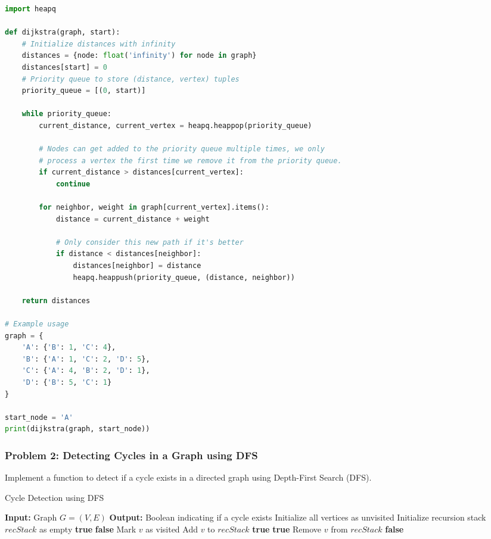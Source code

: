 \documentclass[12pt]{book} %
\begin{document}
\FloatBarrier
\begin{lstlisting}[language=Python, caption=Python implementation of Dijkstra's Algorithm]
import heapq

def dijkstra(graph, start):
    # Initialize distances with infinity
    distances = {node: float('infinity') for node in graph}
    distances[start] = 0
    # Priority queue to store (distance, vertex) tuples
    priority_queue = [(0, start)]
    
    while priority_queue:
        current_distance, current_vertex = heapq.heappop(priority_queue)
        
        # Nodes can get added to the priority queue multiple times, we only
        # process a vertex the first time we remove it from the priority queue.
        if current_distance > distances[current_vertex]:
            continue
        
        for neighbor, weight in graph[current_vertex].items():
            distance = current_distance + weight
            
            # Only consider this new path if it's better
            if distance < distances[neighbor]:
                distances[neighbor] = distance
                heapq.heappush(priority_queue, (distance, neighbor))
    
    return distances

# Example usage
graph = {
    'A': {'B': 1, 'C': 4},
    'B': {'A': 1, 'C': 2, 'D': 5},
    'C': {'A': 4, 'B': 2, 'D': 1},
    'D': {'B': 5, 'C': 1}
}

start_node = 'A'
print(dijkstra(graph, start_node))
\end{lstlisting}
\FloatBarrier

\subsubsection*{Problem 2: Detecting Cycles in a Graph using DFS}
Implement a function to detect if a cycle exists in a directed graph using Depth-First Search (DFS).

\begin{algorithm}
\caption{Cycle Detection using DFS}
\begin{algorithmic}[1]
\State \textbf{Input:} Graph $G=(V, E)$
\State \textbf{Output:} Boolean indicating if a cycle exists
\State Initialize all vertices as unvisited
\State Initialize recursion stack $recStack$ as empty
            \State \Return \textbf{true}
        \EndIf
    \EndIf
\EndFor
\State \Return \textbf{false}
    \State Mark $v$ as visited
    \State Add $v$ to $recStack$
            \State \Return \textbf{true}
            \State \Return \textbf{true}
        \EndIf
    \EndFor
    \State Remove $v$ from $recStack$
    \State \Return \textbf{false}
\EndFunction
\end{algorithmic}
\end{algorithm}
\end{document}
